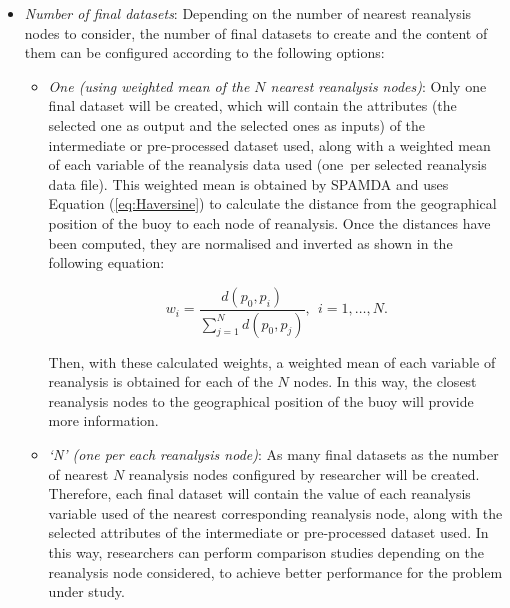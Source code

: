 \documentclass[energies,article,accept,moreauthors,pdftex]{Definitions/mdpi}
\begin{document}
\begin{paracol}{2}
\begin{itemize}
					\item \textit{Number of final datasets}: Depending on the number of nearest reanalysis nodes to consider, the number of final datasets to create and the content of them can be configured according to the following options:
						\begin{itemize}
						
							\item \textit{One (using weighted mean of the $N$ nearest reanalysis nodes)}: Only one final dataset will be created, which will contain the attributes (the selected one as output and the selected ones as inputs) of the intermediate or pre-processed dataset used, along with a weighted mean of each variable of the reanalysis data used (one~per selected reanalysis data file). This weighted mean is obtained by SPAMDA and uses Equation (\ref{eq:Haversine}) to calculate the distance from the geographical position of the buoy to each node of reanalysis. Once the distances have been computed, they are normalised and inverted as shown in the following equation:
								\begin{linenomath*}
									\begin{equation}
										w_i=\frac{d(p_0,p_i)}{\sum_{j=1}^{N} d(p_0,p_j)}, ~~i=1, \ldots, N.
										\label{eq:weightedMean}
									\end{equation}
								\end{linenomath*}

							Then, with these calculated weights, a weighted mean of each variable of reanalysis is obtained for each of the $N$ nodes. In this way, the closest reanalysis nodes to the geographical position of the buoy will provide more information.
							
							
							\item \textit{`N' (one per each reanalysis node)}: As many final datasets as the number of nearest $N$ reanalysis nodes configured by researcher will be created. Therefore, each final dataset will contain the value of each reanalysis variable used of the nearest corresponding reanalysis node, along with the selected attributes of the intermediate or pre-processed dataset used. In this way, researchers can perform comparison studies depending on the reanalysis node considered, to achieve better performance for the problem under study.
							

\end{itemize}
\end{itemize}
\end{paracol}
\end{document}
